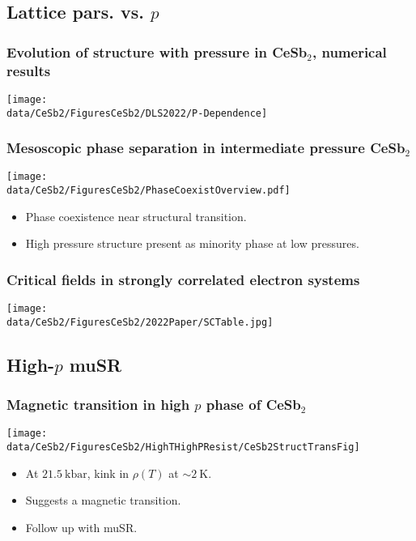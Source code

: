 \subsection{Lattice pars. vs. $p$}
\begin{frame}[label=LatticePars]
\frametitle{Evolution of structure with pressure in CeSb$_2$, numerical results}
\centerline{\texttt{[image: \\data/CeSb2/FiguresCeSb2/DLS2022/P-Dependence]}}

\end{frame}

\begin{frame}[label=CeSb2HighestP]
\frametitle{Mesoscopic phase separation in intermediate pressure CeSb$_2$}
\centerline{\texttt{[image: \\data/CeSb2/FiguresCeSb2/PhaseCoexistOverview.pdf]}}

\begin{itemize}
\item
Phase coexistence near structural transition.
\item
High pressure structure present as minority phase at low pressures.

\end{itemize}
\end{frame}

\begin{frame}[label=SuperconTable]
\frametitle{Critical fields in strongly correlated electron systems}
\texttt{[image: \\data/CeSb2/FiguresCeSb2/2022Paper/SCTable.jpg]}
\end{frame}



\subsection{High-$p$ muSR}
\begin{frame}[label=CeSb2MagnTrans]
\frametitle{Magnetic transition in high $p$ phase of CeSb$_2$}
\vspace{0em}
\centerline{\texttt{[image: \\data/CeSb2/FiguresCeSb2/HighTHighPResist/CeSb2StructTransFig]}}

\begin{itemize}
\item At $\SI{21.5}{\kilo\bar}$, kink in $\rho(T)$ at $\sim \SI{2}{\kelvin}$.
\item Suggests a magnetic transition.
\item Follow up with muSR.
\end{itemize}

\end{frame}




